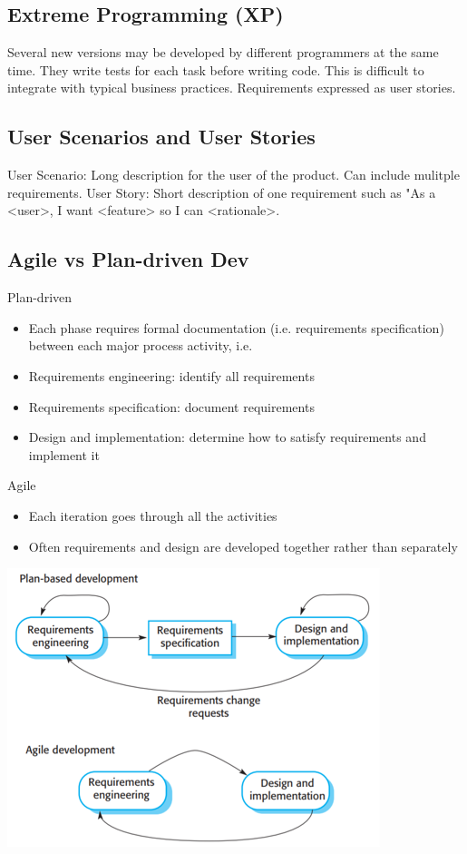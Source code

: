 \documentclass{article}
\begin{document}
    \subsection*{Extreme Programming (XP)}

    Several new versions may be developed by different programmers at the same time.
    They write tests for each task before writing code. This is difficult to integrate with 
    typical business practices. Requirements expressed as user stories.

    \subsection*{User Scenarios and User Stories}

    User Scenario: Long description for the user of the product. Can include mulitple 
    requirements.
    User Story: Short description of one requirement such as "As a <user>, I want <feature>
    so I can <rationale>.

    \subsection*{Agile vs Plan-driven Dev}

    Plan-driven
    \begin{itemize}
        \item 
        Each phase requires formal documentation (i.e. requirements specification) between 
        each major process activity, i.e.
        \item
        Requirements engineering: identify all requirements
        \item
        Requirements specification: document requirements
        \item
        Design and implementation: determine how to satisfy requirements and implement it
    \end{itemize}
    Agile
    \begin{itemize}
        \item 
        Each iteration goes through all the activities
        \item
        Often requirements and design are developed together rather than separately
    \end{itemize}

    \begin{center}
        \includegraphics[scale=0.7]{AgileVSPlan.png}
    \end{center}
\end{document}
